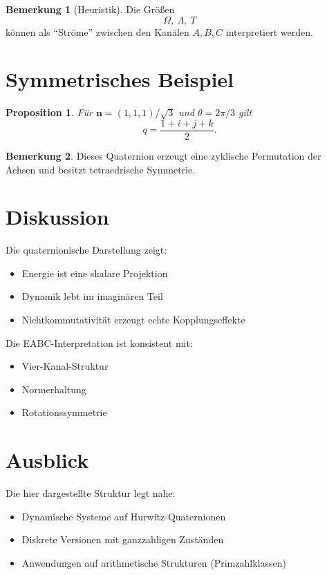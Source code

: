\documentclass[11pt]{article}
\theoremstyle{definition}
\newtheorem{remark}{Bemerkung}
\theoremstyle{plain}
\newtheorem{proposition}{Proposition}
\begin{document}
	\begin{remark}[Heuristik]
		Die Größen
		\[
		\Omega,\ \Lambda,\ T
		\]
		können als ``Ströme'' zwischen den Kanälen $A,B,C$ interpretiert werden.
	\end{remark}
	
	\section{Symmetrisches Beispiel}
	
	\begin{proposition}
		Für $\mathbf n = (1,1,1)/\sqrt3$ und $\theta = 2\pi/3$ gilt
		\[
		q = \frac{1+i+j+k}{2}.
		\]
	\end{proposition}
	
	\begin{remark}
		Dieses Quaternion erzeugt eine zyklische Permutation der Achsen und besitzt tetraedrische Symmetrie.
	\end{remark}
	
	\section{Diskussion}
	
	Die quaternionische Darstellung zeigt:
	
	\begin{itemize}
		\item Energie ist eine skalare Projektion
		\item Dynamik lebt im imaginären Teil
		\item Nichtkommutativität erzeugt echte Kopplungseffekte
	\end{itemize}
	
	Die EABC-Interpretation ist konsistent mit:
	
	\begin{itemize}
		\item Vier-Kanal-Struktur
		\item Normerhaltung
		\item Rotationssymmetrie
	\end{itemize}
	
	\section{Ausblick}
	
	Die hier dargestellte Struktur legt nahe:
	
	\begin{itemize}
		\item Dynamische Systeme auf Hurwitz-Quaternionen
		\item Diskrete Versionen mit ganzzahligen Zuständen
		\item Anwendungen auf arithmetische Strukturen (Primzahlklassen)
	\end{itemize}
	
\end{document}
